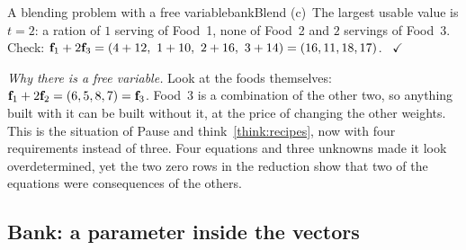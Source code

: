 \documentclass[11pt]{article}
\begin{document}
\begin{exmp}{A blending problem with a free variable}{bankBlend}
(c)~The largest usable value is $t=2$: a ration of $1$ serving of Food~1, none of Food~2 and $2$ servings of Food~3. Check: $\bv{f}_1+2\bv{f}_3=(4+12,\ 1+10,\ 2+16,\ 3+14)=(16,11,18,17)$. \ $\checkmark$

\emph{Why there is a free variable.} Look at the foods themselves: $\mathbf{f}_1+2\mathbf{f}_2=(6,5,8,7)=\mathbf{f}_3$. Food~3 is a combination of the other two, so anything built with it can be built without it, at the price of changing the other weights. This is the situation of Pause and think~\ref{think:recipes}, now with four requirements instead of three. Four equations and three unknowns made it look overdetermined, yet the two zero rows in the reduction show that two of the equations were consequences of the others.
\end{exmp}

\subsection*{Bank: a parameter inside the vectors}
\end{document}
